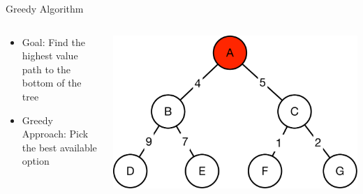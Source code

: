\documentclass[aspectratio=169]{beamer}
\begin{document}
\begin{frame}{Greedy Algorithm}

\begin{columns}
\begin{column}{0.5\textwidth}
\begin{itemize}
\item Goal: Find the highest value path to the bottom of the tree
\item Greedy Approach: Pick the best available option
\end{itemize}
\end{column}
\begin{column}{0.5\textwidth}
\includegraphics[width=1\textwidth]{./lectUL/greedy1.pdf}
\end{column}
\end{columns}

\end{frame}
\end{document}
